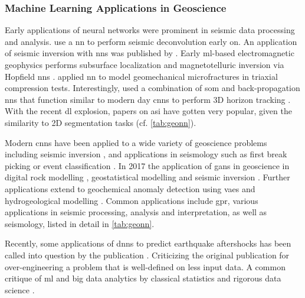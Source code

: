 \subsubsection{Machine Learning Applications in Geoscience}
Early applications of neural networks were prominent in seismic data processing and analysis. \citet{Zhao1988-hu} use a \ac{nn} to perform seismic deconvolution early on. An application of seismic inversion with \acp{nn} was published by \citet{Roth1994-na}. Early \ac{ml}-based electromagnetic geophysics performs subsurface localization \citep{Poulton1992-ft} and magnetotelluric inversion via Hopfield \acp{nn} \citep{Zhang1997-yp}. \citet{Feng1998-ck} applied \ac{nn} to model geomechanical microfractures in triaxial compression tests. Interestingly, \citet{Legget1996-nk} used a combination of \acf{som} and back-propagation \acp{nn} that function similar to modern day \acfp{cnn} to perform 3D horizon tracking \citep{Leggett2003-vq}. With the recent \ac{dl} explosion, papers on \acf{asi} have gotten very popular, given the similarity to 2D segmentation tasks (cf. \cref{tab:geonn}).

Modern \acp{cnn} have been applied to a wide variety of geoscience problems including seismic inversion \citep{Araya-Polo2018-xf}, and applications in seismology such as first break picking \citep{Ross2018-kt} or event classification \citep{Zhu2018-ma,Ross2018-rx}. In 2017 the application of \aclp{gan} in geoscience in digital rock modelling \citep{Mosser2017-ml}, geostatistical modelling \citep{Laloy2017-lp} and seismic inversion \citep{Mosser2018-nf,Mosser2018-hm}. Further applications extend to geochemical anomaly detection \citep{Zuo2018-kl} using \acfp{vae} and hydrogeological modelling \citep{Sahoo2017-xt}. Common applications include \ac{gpr}, various applications in seismic processing, analysis and interpretation, as well as seismology, listed in detail in \cref{tab:geonn}.

Recently, some applications of \aclp{dnn} to predict earthquake aftershocks \citep{devries2018deep} has been called into question by the publication  \citep{mignan2019one}. Criticizing the original publication for over-engineering a problem that is well-defined on less input data. A common critique of \ac{ml} and big data analytics by classical statistics and rigorous data science \citep{mignan2019deeper}.

